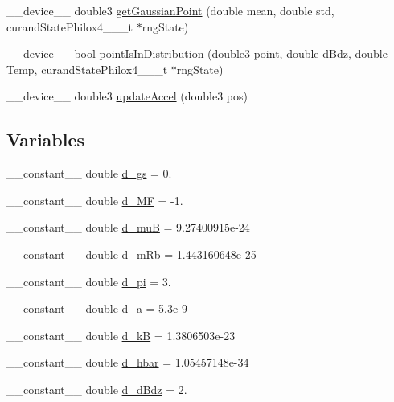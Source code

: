 \begin{DoxyCompactItemize}
\+\_\+\+\_\+device\+\_\+\+\_\+ double3 \hyperlink{set_up_8cu_ad83d6db13f08f46be5179dac799cd0d9}{get\+Gaussian\+Point} (double mean, double std, curand\+State\+Philox4\+\_\+\_\+\_\+t $\ast$rng\+State)
\item 
\+\_\+\+\_\+device\+\_\+\+\_\+ bool \hyperlink{set_up_8cu_a32f8cb52c6e7f4459effb9cd9bdf90e7}{point\+Is\+In\+Distribution} (double3 point, double \hyperlink{initial_system_parameters_8cuh_a25fc2a358206c74d3dfd41c48d05bb9d}{d\+Bdz}, double Temp, curand\+State\+Philox4\+\_\+\_\+\_\+t $\ast$rng\+State)
\item 
\+\_\+\+\_\+device\+\_\+\+\_\+ double3 \hyperlink{set_up_8cu_a5fedaa6e6674256749ed34658343bfa3}{update\+Accel} (double3 pos)
\end{DoxyCompactItemize}
\subsection*{Variables}
\begin{DoxyCompactItemize}
\item 
\+\_\+\+\_\+constant\+\_\+\+\_\+ double \hyperlink{set_up_8cu_ad7fc9ddbbf69cdea9bade997bd3f58f4}{d\+\_\+gs} = 0.
\item 
\+\_\+\+\_\+constant\+\_\+\+\_\+ double \hyperlink{set_up_8cu_ad5c6a29d5e5d7f81c07fcdeac2e12ee8}{d\+\_\+\+M\+F} = -\/1.
\item 
\+\_\+\+\_\+constant\+\_\+\+\_\+ double \hyperlink{set_up_8cu_a93a53c442fbe59aedf7224c0f142979c}{d\+\_\+mu\+B} = 9.\+27400915e-\/24
\item 
\+\_\+\+\_\+constant\+\_\+\+\_\+ double \hyperlink{set_up_8cu_a19b0469e2c969c9dc1f4d2b9d075ef98}{d\+\_\+m\+Rb} = 1.\+443160648e-\/25
\item 
\+\_\+\+\_\+constant\+\_\+\+\_\+ double \hyperlink{set_up_8cu_a246b126f6551267fd21c168b0c1b4fac}{d\+\_\+pi} = 3.
\item 
\+\_\+\+\_\+constant\+\_\+\+\_\+ double \hyperlink{set_up_8cu_a9de002c64acd76b9a5a11c0e3519838c}{d\+\_\+a} = 5.\+3e-\/9
\item 
\+\_\+\+\_\+constant\+\_\+\+\_\+ double \hyperlink{set_up_8cu_a02c2b3a2e3a9d15ae261492f19abb6e0}{d\+\_\+k\+B} = 1.\+3806503e-\/23
\item 
\+\_\+\+\_\+constant\+\_\+\+\_\+ double \hyperlink{set_up_8cu_a42ed36be77a88944d259857a94f80eb4}{d\+\_\+hbar} = 1.\+05457148e-\/34
\item 
\+\_\+\+\_\+constant\+\_\+\+\_\+ double \hyperlink{set_up_8cu_afa16fa4a33416df0d9677c9cbf1c6619}{d\+\_\+d\+Bdz} = 2.
\end{DoxyCompactItemize}


